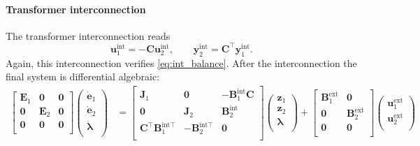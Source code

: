 \paragraph{Transformer interconnection}
The transformer interconnection reads
\begin{equation*}
\mathbf{u}_1^{\text{int}} = -\mathbf{C} \mathbf{u}_2^{\text{int}}, \qquad
\mathbf{y}_2^{\text{int}} = \mathbf{C}^\top \mathbf{y}_1^{\text{int}}.
\end{equation*}
Again, this interconnection verifies \eqref{eq:int_balance}. After the interconnection the final system is differential algebraic:
\begin{align*}
\begin{bmatrix}
\mathbf{E}_1 & \mathbf{0} & \mathbf{0} \\ 
\mathbf{0} & \mathbf{E}_2 & \mathbf{0} \\
\mathbf{0} & \mathbf{0} & \mathbf{0} \\
\end{bmatrix}
\begin{pmatrix}
\dot{\mathbf{e}}_1 \\ \dot{\mathbf{e}}_2 \\ \dot{\bm{\lambda}} \\
\end{pmatrix} &= 
\begin{bmatrix}
\mathbf{J}_1 & \mathbf{0} & -\mathbf{B}_1^{\text{int}} \mathbf{C} \\ 
\mathbf{0} & \mathbf{J}_2 & \mathbf{B}_2^{\text{int}} \\
\mathbf{C}^\top \mathbf{B}_1^{\text{int} \top} & - \mathbf{B}_2^{\text{int} \top} & \mathbf{0} \\
\end{bmatrix}
\begin{pmatrix}
\mathbf{z}_1 \\ 
\mathbf{z}_2 \\
\bm{\lambda} \\
\end{pmatrix}+ 
\begin{bmatrix}
\mathbf{B}_1^{\text{ext}} & \mathbf{0} \\
\mathbf{0} & \mathbf{B}_2^{\text{ext}} \\
\mathbf{0} & \mathbf{0} \\
\end{bmatrix} 
\begin{pmatrix}
\mathbf{u}_1^{\text{ext}} \\ 
\mathbf{u}_2^{\text{ext}} \\

\end{pmatrix}
\end{align*}
